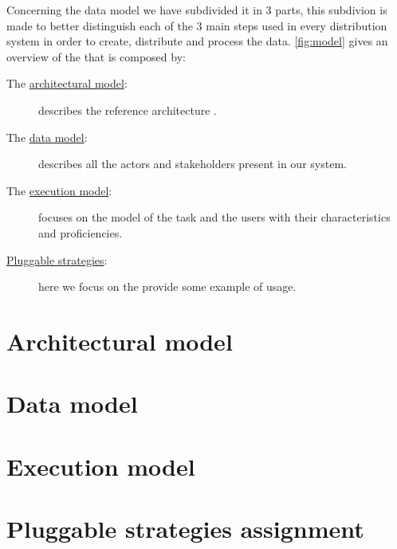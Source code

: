 Concerning the data model we have subdivided it in 3 parts, this subdivion is made to
better distinguish each of the 3 main steps used in every distribution system in order
to create, distribute and process the data. \autoref{fig:model} gives an overview of
the \model that is composed by:
\begin{description}
	\item[The {\hyperref[sec:model:architecture]{architectural model}}:] describes
	the reference architecture .

	\item[The {\hyperref[sec:model:data]{data model}}:] describes
	all the actors and stakeholders present in our system.
	
	\item[The {\hyperref[sec:model:execution]{execution model}}:] focuses
	on the model of the task and the users with their characteristics and proficiencies.

	\item[{\hyperref[sec:model:strategies]{Pluggable strategies}}:] here
	we focus on the provide some example of usage.
\end{description}



\section{Architectural model}
\label{sec:model:architecture}


\section{Data model}
\label{sec:model:data}


\section{Execution model}
\label{sec:model:execution}


\section{Pluggable strategies assignment}
\label{sec:model:strategies}
